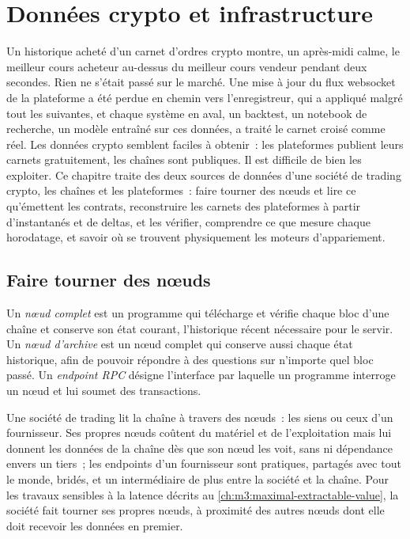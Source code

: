 \chapter{Données crypto et infrastructure}\label{ch:m3:crypto-data-and-infrastructure}

Un historique acheté d'un carnet d'ordres crypto montre, un après-midi calme, le meilleur cours acheteur au-dessus du meilleur cours vendeur
pendant deux secondes. Rien ne s'était passé sur le marché. Une mise à jour du flux websocket de la plateforme a été perdue
en chemin vers l'enregistreur, qui a appliqué malgré tout les suivantes, et chaque système en aval, un backtest,
un notebook de recherche, un modèle entraîné sur ces données, a traité le carnet croisé comme réel. Les données crypto semblent faciles
à obtenir~: les plateformes publient leurs carnets gratuitement, les chaînes sont publiques. Il est difficile de bien les exploiter. Ce
chapitre traite des deux sources de données d'une société de trading crypto, les chaînes et les plateformes~: faire tourner des nœuds et
lire ce qu'émettent les contrats, reconstruire les carnets des plateformes à partir d'instantanés et de deltas, et les vérifier,
comprendre ce que mesure chaque horodatage, et savoir où se trouvent physiquement les moteurs d'appariement.

\section{Faire tourner des nœuds}

\begin{definition}\label{def:m3:crypto-data-and-infrastructure:node}
Un \emph{nœud complet} est un programme qui télécharge et vérifie chaque bloc d'une chaîne et conserve son état courant,
l'historique récent nécessaire pour le servir. Un \emph{nœud d'archive} est un nœud complet qui conserve aussi
chaque état historique, afin de pouvoir répondre à des questions sur n'importe quel bloc passé. Un \emph{endpoint RPC} désigne
l'interface par laquelle un programme interroge un nœud et lui soumet des transactions.
\end{definition}

Une société de trading lit la chaîne à travers des nœuds~: les siens ou ceux d'un fournisseur. Ses propres nœuds coûtent du matériel et de l'exploitation mais lui donnent
les données de la chaîne dès que son nœud les voit, sans  ni dépendance envers un tiers~; les endpoints d'un fournisseur sont
pratiques, partagés avec tout le monde, bridés, et un intermédiaire de plus entre la société et la chaîne. Pour les travaux sensibles à la latence
décrits au \cref{ch:m3:maximal-extractable-value}, la société fait tourner ses propres nœuds, à proximité des autres nœuds dont elle doit recevoir les données en premier.

